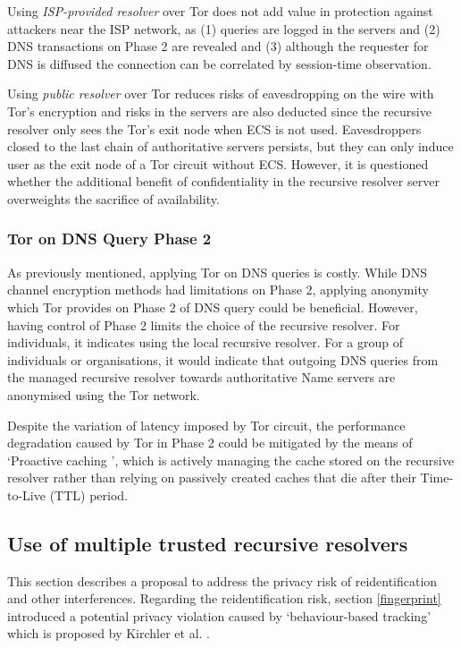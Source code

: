 Using \textit{ISP-provided resolver} over Tor does not add value in protection against attackers near the ISP network, as (1) queries are logged in the servers and (2) DNS transactions on Phase 2 are revealed and (3) although the requester for DNS is diffused the connection can be correlated by session-time observation.

Using \textit{public resolver} over Tor reduces risks of eavesdropping on the wire with Tor's encryption and risks in the servers are also deducted since the recursive resolver only sees the Tor's exit node when ECS is not used.
Eavesdroppers closed to the last chain of authoritative servers persists, but they can only induce user as the exit node of a Tor circuit without ECS.
However, it is questioned whether the additional benefit of confidentiality in the recursive resolver server overweights the sacrifice of availability.

\subsubsection{Tor on DNS Query Phase 2}
As previously mentioned, applying Tor on DNS queries is costly.
While DNS channel encryption methods had limitations on Phase 2, applying anonymity which Tor provides on Phase 2 of DNS query could be beneficial.
However, having control of Phase 2 limits the choice of the recursive resolver.
For individuals, it indicates using the local recursive resolver.
For a group of individuals or organisations, it would indicate that outgoing DNS queries from the managed recursive resolver towards authoritative Name servers are anonymised using the Tor network.

Despite the variation of latency imposed by Tor circuit, the performance degradation caused by Tor in Phase 2 could be mitigated by the means of `Proactive caching \cite{cohen2003proactive}', which is actively managing the cache stored on the recursive resolver rather than relying on passively created caches that die after their Time-to-Live (TTL) period.

\subsection{Use of multiple trusted recursive resolvers}
This section describes a proposal to address the privacy risk of reidentification and other interferences.
Regarding the reidentification risk, section \ref{fingerprint} introduced a potential privacy violation caused by `behaviour-based tracking' which is proposed by Kirchler et al. \cite{kirchler2016tracked}.

